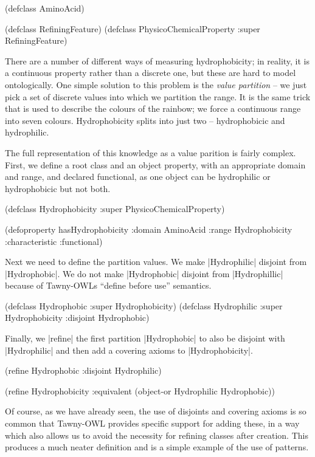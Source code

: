 \begin{tawny}
(defclass AminoAcid)

(defclass RefiningFeature)
(defclass PhysicoChemicalProperty :super RefiningFeature)
\end{tawny}

There are a number of different ways of measuring hydrophobicity; in reality,
it is a continuous property rather than a discrete one, but these are hard to
model ontologically. One simple solution to this problem is the \emph{value
  partition} -- we just pick a set of discrete values into which we partition
the range. It is the same trick that is used to describe the colours of the
rainbow; we force a continuous range into seven colours. Hydrophobicity splits
into just two -- hydrophobicic and hydrophilic.

The full representation of this knowledge as a value parition is fairly
complex. First, we define a root class and an object property, with
an appropriate domain and range, and declared functional, as one object can be
hydrophilic or hydrophobicic but not both.

\begin{tawnyexample}
(defclass Hydrophobicity :super PhysicoChemicalProperty)

(defoproperty hasHydrophobicity :domain AminoAcid
  :range Hydrophobicity :characteristic :functional)
\end{tawnyexample}

Next we need to define the partition values. We make |Hydrophilic|
disjoint from |Hydrophobic|. We do not make |Hydrophobic| disjoint
from |Hydrophillic| because of Tawny-OWLs ``define before use''
semantics.

\begin{tawnyexample}
(defclass Hydrophobic :super Hydrophobicity)
(defclass Hydrophilic :super Hydrophobicity :disjoint Hydrophobic)
\end{tawnyexample}

Finally, we |refine| the first partition |Hydrophobic| to also be disjoint
with |Hydrophilic| and then add a covering axioms to |Hydrophobicity|.

\begin{tawnyexample}
(refine Hydrophobic
  :disjoint Hydrophilic)

(refine Hydrophobicity
  :equivalent (object-or Hydrophilic Hydrophobic))
\end{tawnyexample}

Of course, as we have already seen, the use of disjoints and covering
axioms is so common that Tawny-OWL provides specific support for
adding these, in a way which also allows us to avoid the necessity for
refining classes after creation. This produces a much neater
definition and is a simple example of the use of patterns.

